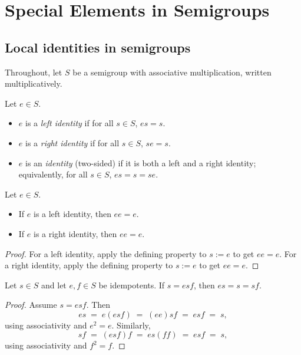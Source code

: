 \chapter {Special Elements in Semigroups}

\section{Local identities in semigroups}

Throughout, let \(S\) be a semigroup with associative multiplication, written multiplicatively.

\begin{definition}
\label{def:identities}
Let \(e\in S\).
\begin{itemize}
  \item \(e\) is a \emph{left identity} if for all \(s\in S\), \(e s = s\).
  \item \(e\) is a \emph{right identity} if for all \(s\in S\), \(s e = s\).
  \item \(e\) is an \emph{identity} (two-sided) if it is both a left and a right identity; equivalently, for all \(s\in S\), \(e s = s = s e\).
\end{itemize}
\end{definition}

\begin{lemma}
\label{lem:identity-idempotent}
Let \(e\in S\).
\begin{itemize}
  \item If \(e\) is a left identity, then \(e e = e\).
  \item If \(e\) is a right identity, then \(e e = e\).
\end{itemize}
\end{lemma}
\begin{proof}
For a left identity, apply the defining property to \(s:=e\) to get \(e e = e\).
For a right identity, apply the defining property to \(s:=e\) to get \(e e = e\).
\end{proof}

\begin{lemma}
\label{lem:simplification}
Let \(s\in S\) and let \(e,f\in S\) be idempotents. If \(s = e s f\), then \(e s = s = s f\).
\end{lemma}
\begin{proof}
Assume \(s = e s f\). Then
\[
e s \;=\; e(e s f) \;=\; (e e) s f \;=\; e s f \;=\; s,
\]
using associativity and \(e^2 = e\). Similarly,
\[
s f \;=\; (e s f) f \;=\; e s (f f) \;=\; e s f \;=\; s,
\]
using associativity and \(f^2 = f\).
\end{proof}

